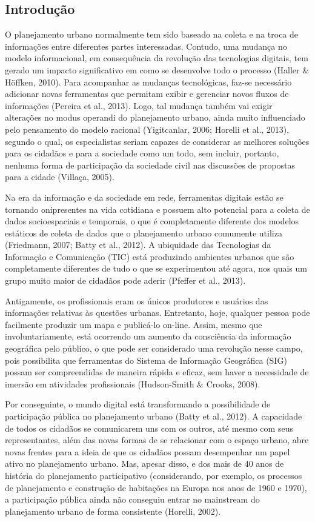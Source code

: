 \documentclass{article}
\begin{document}
\begin{multicols}{2}

\section{Introdução}

O planejamento urbano normalmente tem sido baseado na coleta e na troca de
informações entre diferentes partes interessadas. Contudo, uma mudança no modelo
informacional, em consequência da revolução das tecnologias digitais, tem gerado
um
impacto significativo em como se desenvolve todo o processo (Haller \& Höffken,
2010). Para acompanhar as mudanças
tecnológicas, faz-se necessário adicionar novas ferramentas que permitam exibir
e
gerenciar novos fluxos de informações (Pereira et
al., 2013). Logo, tal mudança também vai exigir alterações no
modus operandi do planejamento urbano, ainda muito influenciado
pelo pensamento do modelo racional (Yigitcanlar,
2006; Horelli et al., 2013),
segundo o qual, os especialistas seriam capazes de considerar as melhores
soluções
para os cidadãos e para a sociedade como um todo, sem incluir, portanto, nenhuma
forma de participação da sociedade civil nas discussões de propostas para a
cidade
(Villaça, 2005).

Na era da informação e da sociedade em rede, ferramentas digitais estão se
tornando
onipresentes na vida cotidiana e possuem alto potencial para a coleta de dados
socioespaciais e temporais, o que é completamente diferente dos modelos
estáticos de
coleta de dados que o planejamento urbano comumente utiliza (Friedmann, 2007;
Batty et
al., 2012). A ubiquidade das Tecnologias da Informação e Comunicação
(TIC) está produzindo ambientes urbanos que são completamente diferentes de tudo
o
que se experimentou até agora, nos quais um grupo muito maior de cidadãos pode
aderir (Pfeffer et al., 2013).

Antigamente, os profissionais eram os únicos produtores e usuários das
informações
relativas às questões urbanas. Entretanto, hoje, qualquer pessoa pode facilmente
produzir um mapa e publicá-lo on-line. Assim, mesmo que involuntariamente, está
ocorrendo um aumento da consciência da informação geográfica pelo público, o que
pode ser considerado uma revolução nesse campo, pois possibilita que ferramentas
do
Sistema de Informação Geográfica (SIG) possam ser compreendidas de maneira
rápida e
eficaz, sem haver a necessidade de imersão em atividades profissionais
(Hudson-Smith \& Crooks, 2008).

Por conseguinte, o mundo digital está transformando a possibilidade de
participação
pública no planejamento urbano (Batty et al.,
2012). A capacidade de todos os cidadãos se comunicarem uns com os
outros, até mesmo com seus representantes, além das novas formas de se
relacionar
com o espaço urbano, abre novas frentes para a ideia de que os cidadãos possam
desempenhar um papel ativo no planejamento urbano. Mas, apesar disso, e dos mais
de
40 anos de história do planejamento participativo (considerando, por exemplo, os
processos de planejamento e construção de habitações na Europa nos anos de 1960
e
1970), a participação pública ainda não conseguiu entrar no
mainstream do planejamento urbano de forma consistente (Horelli, 2002).


\end{multicols}
\end{document}
